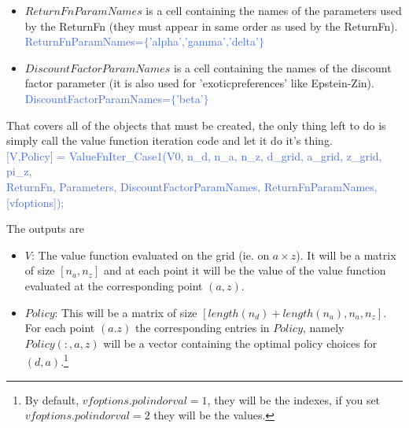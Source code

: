 \begin{itemize}
     \textcolor{RoyalBlue}{Parameters.gamma=2; Parameters.delta=0.05;}
 \item $ReturnFnParamNames$ is a cell containing the names of the parameters used by the ReturnFn (they must appear in same order as used by the ReturnFn). \\
     \textcolor{RoyalBlue}{ReturnFnParamNames=$\{$'alpha','gamma','delta'$\}$}
 \item $DiscountFactorParamNames$ is a cell containing the names of the discount factor parameter (it is also used for 'exoticpreferences' like Epstein-Zin). \\
     \textcolor{RoyalBlue}{DiscountFactorParamNames=$\{$'beta'$\}$}
\end{itemize}

That covers all of the objects that must be created, the only thing left to do is simply call the value function iteration code and let it do it's thing. \\
\textcolor{RoyalBlue}{[V,Policy] = ValueFnIter\_{}Case1(V0, n\_{}d, n\_{}a, n\_{}z, d\_{}grid, a\_{}grid, z\_{}grid, pi\_{}z, } \\
\indent \indent \textcolor{RoyalBlue}{ReturnFn, Parameters, DiscountFactorParamNames, ReturnFnParamNames, [vfoptions]);}

The outputs are
\begin{itemize}
 \item $V$: The value function evaluated on the grid (ie. on $a \times z$). It will be a matrix of size $[n_a,n_z]$ and at each point it will be the value of the value function evaluated
    at the corresponding point $(a,z)$.
 \item $Policy$: This will be a matrix of size $[length(n_d)+length(n_a), n_a, n_z]$. For each point $(a.z)$ the corresponding entries in $Policy$, namely $Policy(:,a,z)$ will be a vector containing
    the optimal policy choices for $(d,a)$.\footnote{By default, $vfoptions.polindorval=1$, they will be the indexes, if you set $vfoptions.polindorval=2$ they will be the values.}
\end{itemize}

